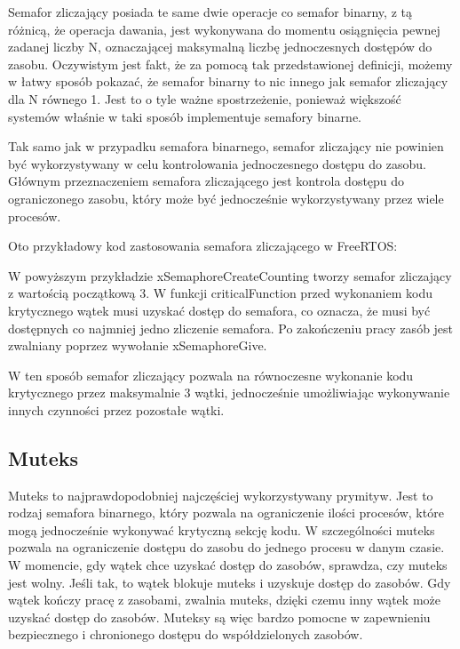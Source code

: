 Semafor zliczający posiada te same dwie operacje co semafor binarny, z tą różnicą, że operacja dawania, jest wykonywana do momentu osiągnięcia
pewnej zadanej liczby N, oznaczającej maksymalną liczbę jednoczesnych dostępów do zasobu. Oczywistym jest fakt, że za pomocą tak przedstawionej
definicji, możemy w łatwy sposób pokazać, że semafor binarny to nic innego jak semafor zliczający dla N równego 1. Jest to o tyle ważne spostrzeżenie,
ponieważ większość systemów właśnie w taki sposób implementuje semafory binarne.

Tak samo jak w przypadku semafora binarnego, semafor zliczający nie powinien być wykorzystywany w celu kontrolowania jednoczesnego dostępu do zasobu.
Głównym przeznaczeniem semafora zliczającego jest kontrola dostępu do ograniczonego zasobu, który może być jednocześnie wykorzystywany przez wiele procesów.

Oto przykładowy kod zastosowania semafora zliczającego w FreeRTOS:


W powyższym przykładzie xSemaphoreCreateCounting tworzy semafor zliczający z wartością początkową 3.
W funkcji criticalFunction przed wykonaniem kodu krytycznego wątek musi uzyskać dostęp do semafora, co oznacza,
że musi być dostępnych co najmniej jedno zliczenie semafora. Po zakończeniu pracy zasób jest zwalniany poprzez wywołanie xSemaphoreGive.

W ten sposób semafor zliczający pozwala na równoczesne wykonanie kodu krytycznego przez maksymalnie 3 wątki,
jednocześnie umożliwiając wykonywanie innych czynności przez pozostałe wątki.

\subsection{Muteks}
Muteks to najprawdopodobniej najczęściej wykorzystywany \gls{prymityw}. Jest to rodzaj semafora binarnego, który pozwala na ograniczenie
ilości procesów, które mogą jednocześnie wykonywać krytyczną sekcję kodu. W szczególności muteks pozwala na ograniczenie dostępu do zasobu
do jednego procesu w danym czasie\cite{design_and_analysis_phillip_a_laplante}. W momencie, gdy wątek chce uzyskać dostęp do zasobów, sprawdza, czy muteks jest wolny. Jeśli tak,
to wątek blokuje muteks i uzyskuje dostęp do zasobów. Gdy wątek kończy pracę z zasobami, zwalnia muteks, dzięki czemu inny wątek może
uzyskać dostęp do zasobów. Muteksy są więc bardzo pomocne w zapewnieniu bezpiecznego i chronionego dostępu do współdzielonych zasobów.

